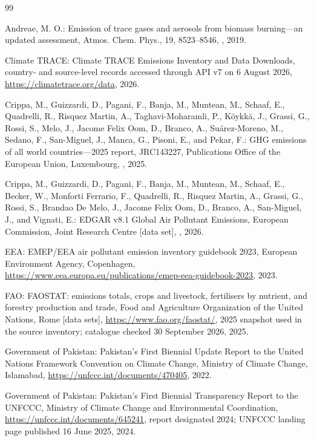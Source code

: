 \documentclass[essd,manuscript]{copernicus}
\begin{document}
\begin{thebibliography}{99}

Andreae, M. O.: Emission of trace gases and aerosols from biomass burning---an updated assessment, Atmos. Chem. Phys., 19, 8523--8546, , 2019.

Climate TRACE: Climate TRACE Emissions Inventory and Data Downloads, country- and source-level records accessed through API v7 on 6 August 2026, \url{https://climatetrace.org/data}, 2026.

Crippa, M., Guizzardi, D., Pagani, F., Banja, M., Muntean, M., Schaaf, E., Quadrelli, R., Risquez Martin, A., Taghavi-Moharamli, P., K\"oykk\"a, J., Grassi, G., Rossi, S., Melo, J., Jacome Felix Oom, D., Branco, A., Su\'arez-Moreno, M., Sedano, F., San-Miguel, J., Manca, G., Pisoni, E., and Pekar, F.: GHG emissions of all world countries---2025 report, JRC143227, Publications Office of the European Union, Luxembourg, , 2025.

Crippa, M., Guizzardi, D., Pagani, F., Banja, M., Muntean, M., Schaaf, E., Becker, W., Monforti Ferrario, F., Quadrelli, R., Risquez Martin, A., Grassi, G., Rossi, S., Brandao De Melo, J., Jacome Felix Oom, D., Branco, A., San-Miguel, J., and Vignati, E.: EDGAR v8.1 Global Air Pollutant Emissions, European Commission, Joint Research Centre [data set], , 2026.

EEA: EMEP/EEA air pollutant emission inventory guidebook 2023, European Environment Agency, Copenhagen, \url{https://www.eea.europa.eu/publications/emep-eea-guidebook-2023}, 2023.

FAO: FAOSTAT: emissions totals, crops and livestock, fertilisers by nutrient, and forestry production and trade, Food and Agriculture Organization of the United Nations, Rome [data sets], \url{https://www.fao.org/faostat/}, 2025 snapshot used in the source inventory; catalogue checked 30 September 2026, 2025.

Government of Pakistan: Pakistan's First Biennial Update Report to the United Nations Framework Convention on Climate Change, Ministry of Climate Change, Islamabad, \url{https://unfccc.int/documents/470405}, 2022.

Government of Pakistan: Pakistan's First Biennial Transparency Report to the UNFCCC, Ministry of Climate Change and Environmental Coordination, \url{https://unfccc.int/documents/645241}, report designated 2024; UNFCCC landing page published 16 June 2025, 2024.


\end{thebibliography}
\end{document}
